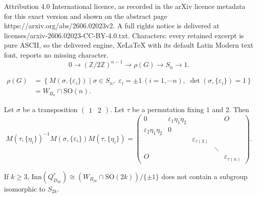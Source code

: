 \documentclass[10pt,a4paper]{amsart}
\begin{document}
Attribution 4.0 International licence, as recorded in the arXiv licence metadata for this exact version and shown on the abstract page https://arxiv.org/abs/2606.02023v2. A full rights notice is delivered at licenses/arxiv-2606.02023-CC-BY-4.0.txt. Characters: every retained excerpt is pure ASCII, so the delivered engine, XeLaTeX with its default Latin Modern text font, reports no missing character.
\begin{equation}
\label{eq:short_exact_sequence_for_rho(G)}
0 \to (\mathbb{Z} / 2 \mathbb{Z})^{n-1} \to \rho(G) \to S_n \to 1.
\end{equation}

\begin{equation}
\label{eq:rho_G}
\begin{split}
\rho(G) &= 
\left\{ M(\sigma , \{ \varepsilon_i \})
\mid \sigma \in S_n , \,\, \varepsilon_i = \pm 1 \, (i = 1, \cdots n) , \,\, 
\det (\sigma , \{ \varepsilon_i \}) = 1 \right\} \\
&= W_{B_n} \cap\mathrm{SO}(n).
\end{split}
\end{equation}

\begin{lemma}
\label{lem:permute_signs}
Let $\sigma$ be a transposition $\begin{pmatrix} 1 & 2 \end{pmatrix}$.
Let $\tau$ be a permutation fixing $1$ and $2$.
Then 
\[
M(\tau, \{ \eta_i \})^{-1} M(\sigma, \{ \varepsilon_i \}) M(\tau, \{ \eta_i \})
= \begin{pmatrix} 
0 & \varepsilon_1 \eta_1 \eta_2 & & & O \\
\varepsilon_2 \eta_1 \eta_2 & 0 & & &  \\
& & \varepsilon_{\tau(3)}& & \\
& & & \ddots \\
O & & & &\varepsilon_{\tau(n)}
\end{pmatrix}.
\]
\end{lemma}

\begin{proposition}
\label{prop:no_S_n}
If $k \geq 3$, 
$\mathrm{Inn} (Q^r_{D_{2k}}) \cong (W_{B_{2k}} \cap \mathrm{SO}(2k))  / \{ \pm 1 \}$ 
does not contain a subgroup isomorphic to $S_{2k}$.
\end{proposition}
\end{document}
